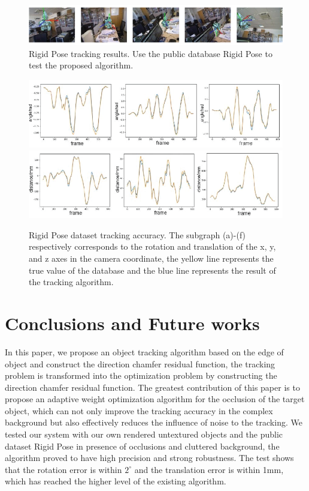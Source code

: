 \documentclass{cta-author}
\begin{document}
  \begin{figure}[!h]
    \centering
    \includegraphics{fig6.eps}
    \caption{Rigid Pose tracking results. Use the public database Rigid Pose to test the proposed algorithm.
      }
    \label{6}
    \end{figure}

  \begin{figure}[!h]
      \centering
      \includegraphics{fig71.eps}
      \includegraphics{fig72.eps}
      \caption{Rigid Pose dataset tracking accuracy. The subgraph (a)-(f) respectively corresponds to the rotation and translation of the x, y, and z axes in the camera coordinate, the yellow line represents the true value of the database and the blue line represents the result of the tracking algorithm.}
      \label{7}
  \end{figure}
\section{Conclusions and Future works}\label{sec5}
In this paper, we propose an object tracking algorithm based on the edge of object and construct the direction chamfer residual function, the tracking problem is transformed into the optimization problem by constructing the direction chamfer residual function. The greatest contribution of this paper is to propose an adaptive weight optimization algorithm for the occlusion of the target object, which can not only improve the tracking accuracy in the complex background but also effectively reduces the influence of noise to the tracking. We tested our system with our own rendered untextured objects and the public dataset Rigid Pose in presence of occlusions and cluttered background, the algorithm proved to have high precision and strong robustness. The test shows that the rotation error is within $2^{\circ}$ and the translation error is within 1mm, which has reached the higher level of the existing algorithm. 
\end{document}
